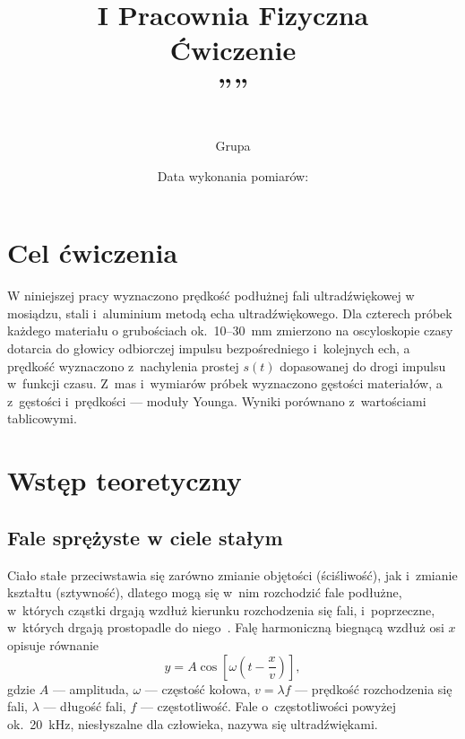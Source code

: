\documentclass[12pt, a4paper]{article}
\title{
    \large I Pracownia Fizyczna \\[0.5em]
    \textbf{Ćwiczenie \nrCwiczenia} \\[0.3em]
    \LARGE \tytul\space''\codeword''
}
\author{
    \autor\\
     Grupa \nrGrupy}
\date{
    Data wykonania pomiarów: \dataWykonania\\
}
\begin{document}

\maketitle
\thispagestyle{empty}
\newpage

\section{Cel ćwiczenia}

W niniejszej pracy wyznaczono prędkość podłużnej fali ultradźwiękowej w mosiądzu, stali
i~aluminium metodą echa ultradźwiękowego. Dla czterech próbek każdego materiału o grubościach
ok.\ 10--30~mm zmierzono na oscyloskopie czasy dotarcia do głowicy odbiorczej impulsu
bezpośredniego i~kolejnych ech, a prędkość wyznaczono z~nachylenia prostej $s(t)$ dopasowanej
do drogi impulsu w~funkcji czasu. Z~mas i~wymiarów próbek wyznaczono gęstości materiałów,
a z~gęstości i~prędkości --- moduły Younga. Wyniki porównano z~wartościami tablicowymi.

\section{Wstęp teoretyczny}

\subsection{Fale sprężyste w ciele stałym}

Ciało stałe przeciwstawia się zarówno zmianie objętości (ściśliwość), jak i~zmianie
kształtu (sztywność), dlatego mogą się w~nim rozchodzić fale podłużne, w~których cząstki
drgają wzdłuż kierunku rozchodzenia się fali, i~poprzeczne, w~których drgają prostopadle
do niego~\cite{skrypt}. Falę harmoniczną biegnącą wzdłuż osi $x$ opisuje równanie
\begin{equation}
    y = A\cos\left[\omega\left(t - \frac{x}{v}\right)\right],
    \label{eq:fala}
\end{equation}
gdzie $A$ --- amplituda, $\omega$ --- częstość kołowa, $v = \lambda f$ --- prędkość
rozchodzenia się fali, $\lambda$ --- długość fali, $f$ --- częstotliwość. Fale o~częstotliwości
powyżej ok.\ 20~kHz, niesłyszalne dla człowieka, nazywa się ultradźwiękami.
\end{document}
